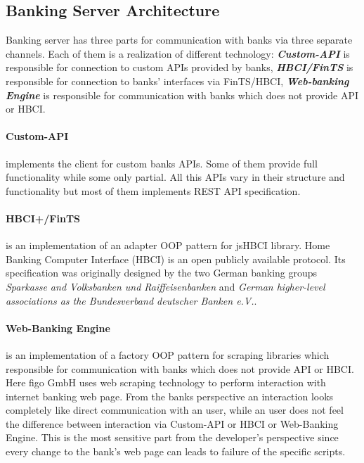 \subsection{Banking Server Architecture}
	
	Banking server has three parts for communication with banks via three separate channels. Each of them is a realization of different technology: \textbf{\textit{Custom-API}} is responsible for connection to custom APIs provided by banks, \textbf{\textit{HBCI/FinTS}} is responsible for connection to banks' interfaces via FinTS/HBCI, \textbf{\textit{Web-banking Engine}} is responsible for communication with banks which does not provide API or HBCI.

	\paragraph{Custom-API} implements the client for custom banks APIs. Some of them provide full functionality while some only partial. All this APIs vary in their structure and functionality but most of them implements REST API specification.
	
	\paragraph{HBCI+/FinTS} is an implementation of an adapter OOP pattern for jsHBCI library. Home Banking Computer Interface (HBCI) is an open publicly available protocol. Its specification was originally designed by the two German banking groups \textit{Sparkasse and Volksbanken und Raiffeisenbanken} and \textit{German higher-level associations as the Bundesverband deutscher Banken e.V.}.  \cite{finTS}
	
	\paragraph{Web-Banking Engine} is an implementation of a factory OOP pattern for scraping libraries which responsible for communication with banks which does not provide API or HBCI. Here figo GmbH uses web scraping technology to perform interaction with internet banking web page.
	From the banks perspective an interaction looks completely like direct communication with an user, while an user does not feel the difference between interaction via Custom-API or HBCI or Web-Banking Engine.
	This is the most sensitive part from the developer's perspective since every change to the bank's web page can leads to failure of the specific scripts. \\
	

